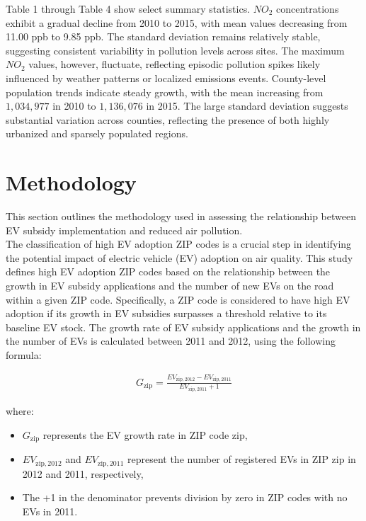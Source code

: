 \documentclass[12pt]{article}
\newcommand\tab[1][.50cm]{\hspace*{#1}}
\begin{document}
	\begin{multicols}{2}
		Table 1 through Table 4 show select summary statistics. $NO_2$ concentrations exhibit a gradual decline from 2010 to 2015, with mean values decreasing from 11.00 ppb to 9.85 ppb. The standard deviation remains relatively stable, suggesting consistent variability in pollution levels across sites. The maximum$NO_2$ values, however, fluctuate, reflecting episodic pollution spikes likely influenced by weather patterns or localized emissions events. County-level population trends indicate steady growth, with the mean increasing from $1,034,977$ in 2010 to $1,136,076$ in 2015. The large standard deviation suggests substantial variation across counties, reflecting the presence of both highly urbanized and sparsely populated regions.\\ 
		
		\section*{Methodology}
		
		This section outlines the methodology used in assessing the relationship between EV subsidy implementation and reduced air pollution.\\
		\tab The classification of high EV adoption ZIP codes is a crucial step in identifying the potential impact of electric vehicle (EV) adoption on air quality. This study defines high EV adoption ZIP codes based on the relationship between the growth in EV subsidy applications and the number of new EVs on the road within a given ZIP code. Specifically, a ZIP code is considered to have high EV adoption if its growth in EV subsidies surpasses a threshold relative to its baseline EV stock. The growth rate of EV subsidy applications and the growth in the number of EVs is calculated between 2011 and 2012, using the following formula:
		
		\begin{align}
			G_{\text{zip}} = \frac{EV_{\text{zip},2012} - EV_{\text{zip},2011}}{EV_{\text{zip},2011} + 1}
		\end{align}
		
		where:
		\begin{itemize}
			\item \( G_{\text{zip}} \) represents the EV growth rate in ZIP code \( \text{zip} \),
			\item \( EV_{\text{zip},2012} \) and \( EV_{\text{zip},2011} \) represent the number of registered EVs in ZIP \( \text{zip} \) in 2012 and 2011, respectively,
			\item The +1 in the denominator prevents division by zero in ZIP codes with no EVs in 2011.
		\end{itemize}
		

\end{multicols}
\end{document}
